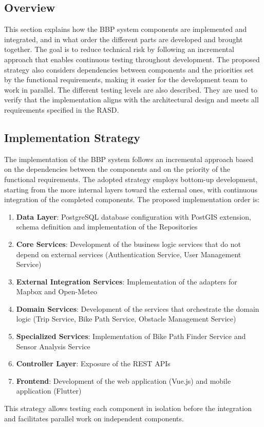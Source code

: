 \subsection{Overview}
This section explains how the BBP system components are implemented and integrated, and in what order the different parts are developed and brought together. The goal is to reduce technical risk by following an incremental approach that enables continuous testing throughout development. The proposed strategy also considers dependencies between components and the priorities set by the functional requirements, making it easier for the development team to work in parallel. The different testing levels are also described. They are used to verify that the implementation aligns with the architectural design and meets all requirements specified in the RASD.

\subsection{Implementation Strategy}
The implementation of the BBP system follows an incremental approach based on the dependencies between the components and on the priority of the functional requirements. The adopted strategy employs bottom-up development, starting from the more internal layers toward the external ones, with continuous integration of the completed components.
The proposed implementation order is:
\begin{enumerate}
    \item \textbf{Data Layer}: PostgreSQL database configuration with PostGIS extension, schema definition and implementation of the Repositories
    \item \textbf{Core Services}: Development of the business logic services that do not depend on external services (Authentication Service, User Management Service)
    \item \textbf{External Integration Services}: Implementation of the adapters for Mapbox and Open-Meteo
    \item \textbf{Domain Services}: Development of the services that orchestrate the domain logic (Trip Service, Bike Path Service, Obstacle Management Service)
    \item \textbf{Specialized Services}: Implementation of Bike Path Finder Service and Sensor Analysis Service
    \item \textbf{Controller Layer}: Exposure of the REST APIs
    \item \textbf{Frontend}: Development of the web application (Vue.js) and mobile application (Flutter)
\end{enumerate}
This strategy allows testing each component in isolation before the integration and facilitates parallel work on independent components.

